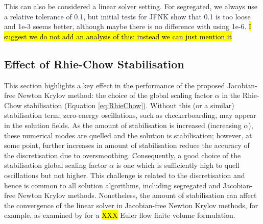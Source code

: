 \documentclass[sn-mathphys,Numbered]{sn-jnl}%
\begin{document}
This can also be considered a linear solver setting. For segregated, we always use a relative tolerance of 0.1, but initial tests for JFNK show that 0.1 is too loose and 1e-3 seems better, although maybe there is no difference with using 1e-6.
\hl{I suggest we do not add an analysis of this: instead we can just mention it}



\subsection{Effect of Rhie-Chow Stabilisation}
This section highlights a key effect in the performance of the proposed Jacobian-free Newton Krylov method: the choice of the global scaling factor $\alpha$ in the Rhie-Chow stabilisation (Equation \ref{eq:RhieChow}).
Without this (or a similar) stabilisation term, zero-energy oscillations, such as checkerboarding, may appear in the solution fields.
As the amount of stabilisation is increased (increasing $\alpha$), these numerical modes are quelled and the solution is stabilisation; however, at some point, further increases in amount of stabilisation reduce the accuracy of the discretisation due to oversmoothing.
Consequently, a good choice of the stabilisation global scaling factor $\alpha$ is one which is sufficiently high to quell oscillations but not higher.
This challenge is related to the discretisation and hence is common to all solution algorithms, including segregated and Jacobian-free Newton Krylov methods.
Nonetheless, the amount of stabilisation can affect the convergence of the linear solver in Jacobian-free Newton Krylov methods, for example, as examined by \citet{Nishikawa} for a \hl{XXX} Euler flow finite volume formulation.
\end{document}
